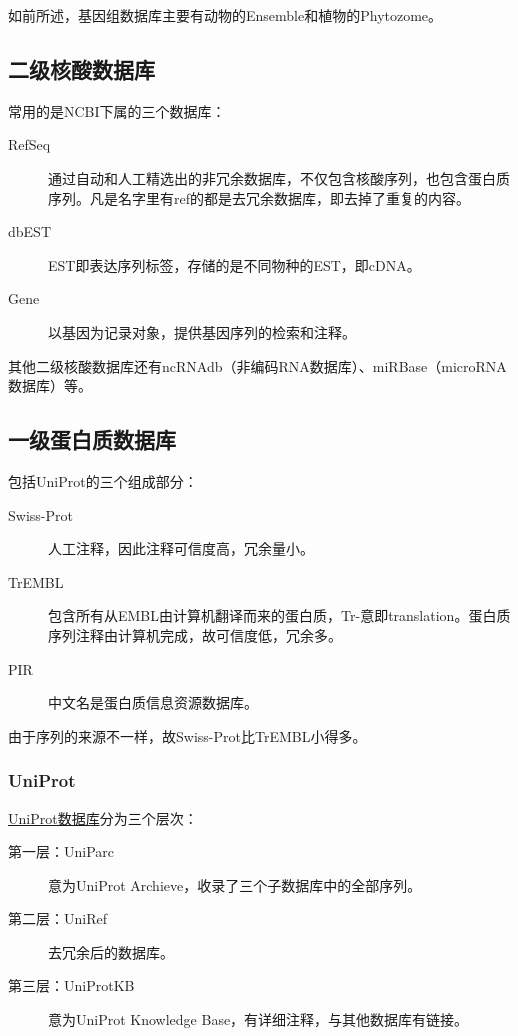 如前所述，基因组数据库主要有动物的Ensemble和植物的Phytozome。

\subsection{二级核酸数据库}

常用的是NCBI下属的三个数据库：
\begin{description}
	\item[RefSeq] 通过自动和人工精选出的非冗余数据库，不仅包含核酸序列，也包含蛋白质序列。凡是名字里有ref的都是去冗余数据库，即去掉了重复的内容。
	\item[dbEST] EST即表达序列标签，存储的是不同物种的EST，即cDNA。
	\item[Gene] 以基因为记录对象，提供基因序列的检索和注释。
\end{description}

其他二级核酸数据库还有ncRNAdb（非编码RNA数据库）、miRBase（microRNA数据库）等。

\subsection{一级蛋白质数据库}

包括UniProt的三个组成部分：
\begin{description}
	\item[Swiss-Prot] 人工注释，因此注释可信度高，冗余量小。
	\item[TrEMBL] 包含所有从EMBL由计算机翻译而来的蛋白质，Tr-意即translation。蛋白质序列注释由计算机完成，故可信度低，冗余多。
	\item[PIR] 中文名是蛋白质信息资源数据库。
\end{description}

由于序列的来源不一样，故Swiss-Prot比TrEMBL小得多。

\subsubsection{UniProt}

\href{https://www.uniprot.org/}{UniProt数据库}分为三个层次：

\begin{description}
	\item [第一层：UniParc] 意为UniProt Archieve，收录了三个子数据库中的全部序列。
	\item[第二层：UniRef] 去冗余后的数据库。
	\item[第三层：UniProtKB] 意为UniProt Knowledge Base，有详细注释，与其他数据库有链接。
\end{description}

